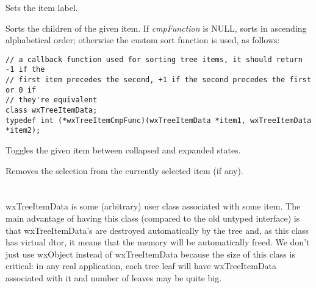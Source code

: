 \label{wxtreectrlsetitemtext}


Sets the item label.

\label{wxtreectrlsortchildren}


Sorts the children of the given item. If {\it cmpFunction} is NULL, sorts in ascending alphabetical order;
otherwise the custom sort function is used, as follows:

{\small
\begin{verbatim}
// a callback function used for sorting tree items, it should return -1 if the
// first item precedes the second, +1 if the second precedes the first or 0 if
// they're equivalent
class wxTreeItemData;
typedef int (*wxTreeItemCmpFunc)(wxTreeItemData *item1, wxTreeItemData *item2);
\end{verbatim}
}



\label{wxtreectrltoggle}


Toggles the given item between collapsed and expanded states.

\label{wxtreectrlunselect}


Removes the selection from the currently selected item (if any).

\section{}\label{wxtreeitemdata}

wxTreeItemData is some (arbitrary) user class associated with some item. The
main advantage of having this class (compared to the old untyped interface) is
that wxTreeItemData's are destroyed automatically by the tree and, as this
class has virtual dtor, it means that the memory will be automatically
freed. We don't just use wxObject instead of wxTreeItemData because
the size of this class is critical: in any real application, each tree leaf
will have wxTreeItemData associated with it and number of leaves may be
quite big.

